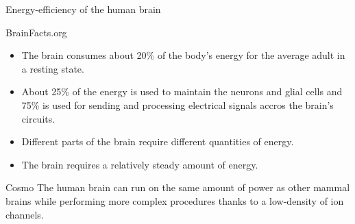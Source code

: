 \documentclass{beamer}
\begin{document}



	\begin{frame}{Energy-efficiency of the human brain}
		\begin{block}{BrainFacts.org}
			\begin{itemize}
				\justifying
				\item The brain consumes about 20\% of the body's energy for the average adult in a resting state.
				\item About 25\% of the energy is used to maintain the neurons and glial cells and 75\% is used for sending and processing electrical signals accros the brain's circuits.
				\item Different parts of the brain require different quantities of energy.
				\item The brain requires a relatively steady amount of energy.
			\end{itemize} 
		\end{block}
		\begin{block}{Cosmo}
			\justifying
			The human brain can run on the same amount of power as other mammal brains while performing more complex procedures thanks to a low-density of ion channels.
		\end{block}
	\end{frame}
\end{document}
